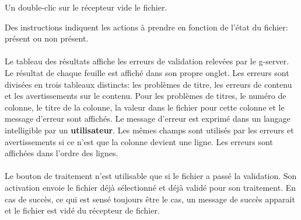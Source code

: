 Un double-clic sur le récepteur vide le fichier.

Des instructions indiquent les actions à prendre en fonction de l'état du fichier: présent ou non présent. %

\paragraph{}
Le tableau des résultats affiche les erreurs de validation relevées par le \gls{g-server}.
Le résultat de chaque feuille est affiché dans son propre onglet.
Les erreurs sont divisées en trois tableaux distincts: les problèmes de titre, les erreurs de contenu et les avertissements sur le contenu.
Pour les problèmes de titres, le numéro de colonne, le titre de la colonne, la valeur dans le fichier pour cette colonne et le message d'erreur sont affichés.
Le message d'erreur est exprimé dans un langage intelligible par un \textbf{utilisateur}.
Les mêmes champs sont utilisés par les erreurs et avertissements si ce n'est que la colonne devient une ligne.
Les erreurs sont affichées dans l'ordre des lignes.

\paragraph{}
Le bouton de traitement n'est utilisable que si le fichier a passé la validation.
Son activation envoie le fichier déjà sélectionné et déjà validé pour son traitement.
En cas de succès, ce qui est sensé toujours être le cas, un message de succès apparait et le fichier est vidé du récepteur de fichier.

